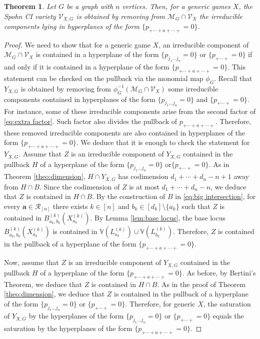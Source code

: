 \documentclass[11pt]{amsart}
\numberwithin{equation}{section}
\theoremstyle{plain}
\newtheorem{theorem}{Theorem}
\numberwithin{theorem}{section}
\theoremstyle{definition}
\begin{document}
\begin{theorem}\label{theo:saturation}
Let $G$ be a graph with $n$ vertices. Then, for a generic games $X$, the Spohn CI variety $\mathcal{V}_{X,G}$ is obtained by removing from $\mathcal{M}_G\cap\mathcal{V}_X$  the irreducible components lying in hyperplanes of the form $\{p_{+\cdots+a+\cdots +}=0\}$.
\end{theorem}
\begin{proof}
    We need to show that for a generic game $X$,  an irreducible component of $\mathcal{M}_G\cap\mathcal{V}_X$ is contained in a hyperplane of the form $\{p_{j_1\ldots j_n}=0\}$ or $\{p_{+\cdots+}=0\}$  if and only if it is contained in a hyperplane of the form $\{p_{+\cdots+a+\cdots+}=0\}$. This statement can be checked on the pullback via the monomial map $\phi_G$. Recall that $Y_{X,G}$ is obtained by removing from $\phi_G^{-1}(\mathcal{M}_G\cap\mathcal{V}_X)$ some irreducible components contained in hyperplanes of the form $ \{p_{j_1\ldots j_n}=0\}$ and $ \{p_{+\cdots+}=0\}$. For instance, some of these irreducible components arise from the second factor of \eqref{eq:extra factor}. Such factor also divides the pullback of $p_{+\cdots+a+\cdots+}$. Therefore, these removed irreducible components are also contained in hyperplanes of the form $\{p_{+\cdots+a+\cdots+}=0\}$. We deduce that it is enough to check the statement for $Y_{X,G}$. Assume that $Z$ is an irreducible component of $Y_{X,G}$ contained in the pullback $H$ of a hyperplane of the form $\{p_{j_1\ldots j_n}=0\} $ or$\{p_{+\cdots+}=0\}$. As in Theorem \ref{theo:dimension}, $H\cap Y_{X,G}$ has codimension $d_1+\cdots+d_n-n+1$ away from $H\cap B$. Since the codimension of $Z$ is at most $d_1+\cdots+d_n-n$, we deduce that $Z$ is contained in $H\cap B$. By the construction of $B$ in \eqref{eq:big intersection}, for every $\mathbf{a}\in\mathcal{R}_{[n]}$ there exists $k\in [n]$ and $b_k\in[d_k]\setminus\{a_k\}$ such that $Z$ is contained in $B_{a_k,b_k}^{(k)}(X_{a_k}^{(k)})$. By Lemma \ref{lem:base locus}, the base locus  $B_{a_k,b_k}^{(k)}(X_{a_k}^{(k)})$ is contained in $\mathbb{V}(L_{a_k}^{(k)})\cup\mathbb{V}(L_{b_k}^{(k)})$. Therefore, $Z$ is contained in the pullback of a hyperplane of the form $\{p_{+\cdots+a+\cdots+}=0\}$.

Now,  assume that $Z$ is an irreducible component of $Y_{X,G}$ contained in the pullback $H$ of a hyperplane of the form $\{p_{+\cdots+a+\cdots +}=0\} $. As before, by Bertini's Theorem, we deduce that $Z$ is contained in $H\cap B$. As in the proof of Theorem \ref{theo:dimension}, we deduce that $Z$ is contained in the pullback of a  hyperplane of the form $ \{p_{j_1\ldots j_n}=0\}$ or $ \{p_{+\cdots+}=0\}$. Therefore, for generic $X$, the saturation of $Y_{X,G}$ by the hyperplanes of the form $ \{p_{j_1\ldots j_n}=0\}$ or $ \{p_{+\cdots+}=0\}$ equals the saturation by the hyperplanes of the form $\{p_{+\cdots+a+\cdots+}=0\}$.
\end{proof}
\end{document}
